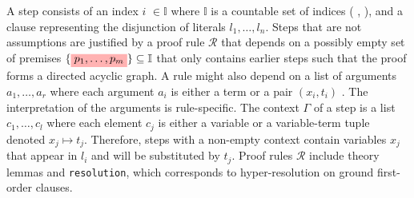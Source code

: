A step %
consists of an index \colorbox{indexClr!30}{$i$} $\in \mathbb{I}$ where $\mathbb{I}$ is a countable set of indices ( , ), and a clause representing the disjunction of literals \colorbox{green!30}{$l_1, \dots, l_n$}.
Steps that are not assumptions are justified by a proof rule \colorbox{purple!30}{$\mathcal{R}$} that depends on a possibly empty set of premises $\{\colorbox{red!30}{$p_1, \dots,  p_m$}\} \subseteq \mathbb{I}$ that only contains earlier steps such that the proof forms
a directed acyclic graph. A rule might also depend on a list of arguments \colorbox{orange!30}{$a_1, \dots, a_r$} where each argument $a_i$ is either a term or a pair $(x_i, t_i)$ .
The interpretation of the arguments is rule-specific. The context \colorbox{blue!30}{$\Gamma$} of a step is a list $c_1, \dots, c_l $ where each element $c_j$ is either a variable or a variable-term tuple denoted $x_j \mapsto t_j$.
Therefore, steps with a non-empty context contain variables $x_j$ that appear in \colorbox{green!30}{$l_i$} and will be substituted by $t_j$. Proof rules \colorbox{purple!30}{$\mathcal{R}$} include theory lemmas and \texttt{resolution}, which corresponds to hyper-resolution on ground first-order clauses.

